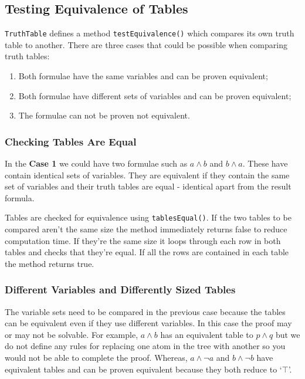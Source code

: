 \documentclass{report}
\begin{document}
\subsection{Testing Equivalence of Tables}
\label{sub:testing_equivalence_of_tables}

{\tt TruthTable} defines a method {\tt testEquivalence()} which compares its own truth table to another. There are three cases that could be possible when comparing truth tables:

\begin{enumerate}[leftmargin=*, align=left, label=\bfseries Case \arabic*:]
\item Both formulae have the same variables and can be proven equivalent;

\item Both formulae have different sets of variables and can be proven equivalent;

\item The formulae can not be proven not equivalent.
\end{enumerate}

\subsubsection{Checking Tables Are Equal}

In the \textbf{Case 1} we could have two formulae such as $a \land b$ and $b \land a$. These have contain identical sets of variables. They are equivalent if they contain the same set of variables and their truth tables are equal - identical apart from the result formula.

Tables are checked for equivalence using {\tt tablesEqual()}. If the two tables to be compared aren't the same size the method immediately returns false to reduce computation time. If they're the same size it loops through each row in both tables and checks that they're equal. If all the rows are contained in each table the method returns true.

\subsubsection{Different Variables and Differently Sized Tables}

The variable sets need to be compared in the previous case because the tables can be equivalent even if they use different variables. In this case the proof may or may not be solvable. For example, $a \land b$ has an equivalent table to $p \land q$ but we do not define any rules for replacing one atom in the tree with another so you would not be able to complete the proof. Whereas, $a \land \lnot a$ and $b \land \lnot b$ have equivalent tables and can be proven equivalent because they both reduce to `$\top$'.
\end{document}
